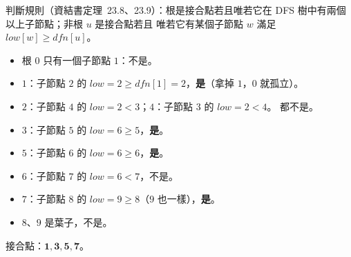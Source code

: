 \begin{pastsoln}
判斷規則（資結書定理~23.8、23.9）：根是接合點若且唯若它在 DFS 樹中有兩個以上子節點；非根 $u$ 是接合點若且
唯若它有某個子節點 $w$ 滿足 $\mathit{low}[w] \ge \mathit{dfn}[u]$。
\begin{itemize}
\item 根 $0$ 只有一個子節點 $1$：不是。
\item $1$：子節點 $2$ 的 $\mathit{low} = 2 \ge \mathit{dfn}[1] = 2$，\textbf{是}（拿掉 $1$，$0$ 就孤立）。
\item $2$：子節點 $4$ 的 $\mathit{low} = 2 < 3$；$4$：子節點 $3$ 的 $\mathit{low} = 2 < 4$。 都不是。
\item $3$：子節點 $5$ 的 $\mathit{low} = 6 \ge 5$，\textbf{是}。
\item $5$：子節點 $6$ 的 $\mathit{low} = 6 \ge 6$，\textbf{是}。
\item $6$：子節點 $7$ 的 $\mathit{low} = 6 < 7$，不是。
\item $7$：子節點 $8$ 的 $\mathit{low} = 9 \ge 8$（$9$ 也一樣），\textbf{是}。
\item $8$、$9$ 是葉子，不是。
\end{itemize}
接合點：$\mathbf{1, 3, 5, 7}$。


\end{pastsoln}
